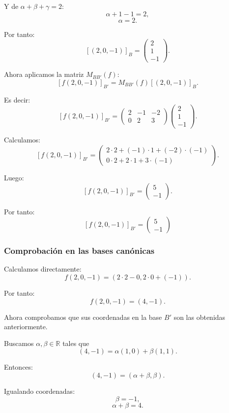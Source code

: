 \documentclass[12pt]{article}
\begin{document}
Y de \(\alpha+\beta+\gamma=2\):
\[
\alpha+1-1=2,
\]
\[
\alpha=2.
\]

Por tanto:
\[
[(2,0,-1)]_B=
\begin{pmatrix}
2\\
1\\
-1
\end{pmatrix}.
\]

Ahora aplicamos la matriz \(M_{BB'}(f)\):
\[
[f(2,0,-1)]_{B'}
=
M_{BB'}(f)[(2,0,-1)]_B.
\]

Es decir:
\[
[f(2,0,-1)]_{B'}
=
\begin{pmatrix}
2&-1&-2\\
0&2&3
\end{pmatrix}
\begin{pmatrix}
2\\
1\\
-1
\end{pmatrix}.
\]

Calculamos:
\[
[f(2,0,-1)]_{B'}
=
\begin{pmatrix}
2\cdot 2+(-1)\cdot 1+(-2)\cdot(-1)\\
0\cdot 2+2\cdot 1+3\cdot(-1)
\end{pmatrix}.
\]

Luego:
\[
[f(2,0,-1)]_{B'}
=
\begin{pmatrix}
5\\
-1
\end{pmatrix}.
\]

Por tanto:
\[
\boxed{
[f(2,0,-1)]_{B'}=
\begin{pmatrix}
5\\
-1
\end{pmatrix}
}
\]

\subsubsection*{Comprobación en las bases canónicas}

Calculamos directamente:
\[
f(2,0,-1)=(2\cdot 2-0,2\cdot 0+(-1)).
\]

Por tanto:
\[
f(2,0,-1)=(4,-1).
\]

Ahora comprobamos que sus coordenadas en la base \(B'\) son las obtenidas anteriormente.

Buscamos \(\alpha,\beta\in\mathbb{R}\) tales que
\[
(4,-1)=\alpha(1,0)+\beta(1,1).
\]

Entonces:
\[
(4,-1)=(\alpha+\beta,\beta).
\]

Igualando coordenadas:
\[
\beta=-1,
\]
\[
\alpha+\beta=4.
\]
\end{document}
